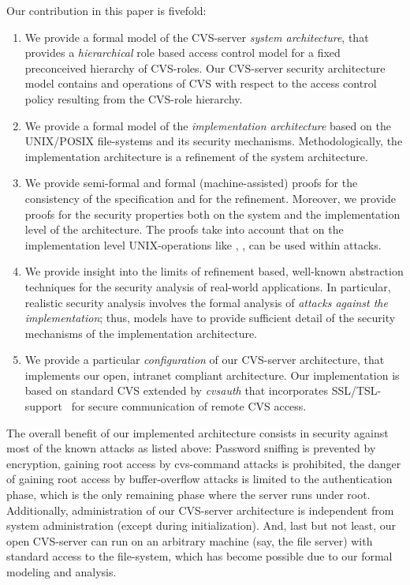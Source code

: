 Our contribution in this paper is fivefold:
\begin{enumerate}
\item We provide a formal model of the CVS-server \emph{system
    architecture}, that
  provides a \emph{hierarchical} role based access control model for a fixed
  preconceived hierarchy of CVS-roles. Our CVS-server security architecture
  model contains  and  operations of CVS with respect to the
  access control policy resulting from the CVS-role hierarchy.
\item We provide a formal model of the \emph{implementation
    architecture} based on the UNIX/POSIX
  file-systems and its security mechanisms.  Methodologically, the
  implementation architecture is a refinement of the system architecture.
\item We provide semi-formal and formal (machine-assisted) proofs for the
  consistency of the specification and for the refinement.  Moreover, we provide
  proofs for the security properties both on the system and the implementation
  level of the architecture.  The proofs take into account that on the
  implementation level UNIX-operations like , ,
   can be used within attacks.
\item We provide insight into the limits of refinement based,
  well-known abstraction techniques for the security analysis of
  real-world applications.  In particular, realistic security analysis
  involves the formal analysis of \emph{attacks against the
    implementation}; thus, models have to provide sufficient detail of
  the security mechanisms of the implementation architecture.
\item We provide a particular \emph{configuration} of our CVS-server
  architecture, that implements our open, intranet compliant architecture. Our
  implementation is based on standard CVS extended by \emph{cvsauth} that
  incorporates SSL/TSL-support~\cite{itef:rfc2246:1999} for secure communication of remote CVS access.
\end{enumerate}

The overall benefit of our implemented architecture consists in
security against most of the known attacks as listed above: Password
sniffing is prevented by encryption, gaining root access by
cvs-command attacks is prohibited, the danger of gaining root access
by buffer-overflow attacks is limited to the authentication phase,
which is the only remaining phase where the server runs under root.
Additionally, administration of our CVS-server architecture is
independent from system administration (except during initialization).
And, last but not least, our open CVS-server can run on an arbitrary
machine (say, the file server) with standard access to the
file-system, which has become possible due to our formal modeling and
analysis.
   
